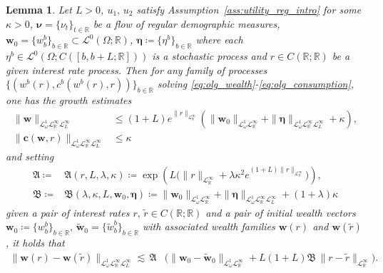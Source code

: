 \documentclass[10pt,a4paper]{amsart}
\theoremstyle{plain}
\newtheorem{lem}{Lemma}
\theoremstyle{plain}
\theoremstyle{definition}
\theoremstyle{remark}
\newcommand{\bc}{\mathbf{c}}
\newcommand{\bmeta}{\boldsymbol{\eta}}
\newcommand{\bnu}{\boldsymbol{\nu}}
\newcommand{\bw}{\mathbf{w}}
\newcommand{\mbR}{\mathbb{R}}
\newcommand{\mfA}{\mathfrak{A}}
\newcommand{\mfB}{\mathfrak{B}}
\newcommand{\msL}{\mathscr{L}}
\newcommand{\red}[1]{#1}
\begin{document}
\begin{lem}\label{lem:olg_growth_stable}
	 Let $L>0$, $u_1,\, u_2$ satisfy Assumption~\ref{ass:utility_reg_intro} for some $\kappa >0$, $\bnu = \{\nu_t\}_{t\in \mbR}$ be a flow of \emph{regular demographic measures}, $\bw_0  = \{w^b_b\}_{b\in \mbR}\subset\msL^0(\Omega;\mbR)$, $\bmeta \coloneqq \{\eta^b\}_{b\in \mbR}$ where each $\eta^b \in \msL^0(\Omega;C([b,b+L;\mbR]))$ is a stochastic process and $r \in C(\mbR;\mbR)$ be a given interest rate process. %
     Then for any family of processes $\{(w^b(r),c^b(w^b(r),r))\}_{b\in \mbR}$ solving  \eqref{eq:olg_wealth}-\eqref{eq:olg_consumption}, one has the growth estimates
	 \begin{align}
	 	 \|\bw\|_{\msL^1_\omega \msL^\infty_{\mbR} \msL^\infty_{L}} &\leq  (1+L)e^{\|r\|_{\msL^\infty_{\mbR}}} \left(\|\bw_0\|_{\msL^1_\omega \msL^\infty_\mbR } +    \|\bmeta\|_{ \msL^1_\omega \msL^\infty_{\mbR} \msL^\infty_{L}} + \kappa \right), \label{eq:olg_wealth_apriori_bound} \\
          \|\bc(\bw,r)\|_{\msL^1_\omega  \msL^\infty_{\mbR}\msL^\infty_{L}}  &\leq \kappa \label{eq:olg_consumption_bdd}
	 \end{align}
	 and setting 
	 \begin{align*}
	 	\mfA\coloneqq & \mfA(r,L,\lambda,\kappa) \coloneqq \exp\left(L\big(\|r\|_{\msL^\infty_\mbR} + \lambda \kappa^2 e^{(1+L)\|r\|_{\msL^\infty_{\mbR}} } \big)\right),\\
       \mfB\coloneqq &\mfB(\lambda,\kappa,L,\bw_0,\bmeta) \coloneqq  \|\bw_0\|_{\msL^1_\omega \msL^\infty_\mbR } +    \|\bmeta\|_{\msL^1_\omega \msL^\infty_{\mbR} \msL^\infty_{L}}+ (1+\lambda)\kappa 
	 \end{align*}
	 given a pair of interest rates $r,\,\tilde{r} \in C(\mbR;\mbR)$ and a pair of initial wealth vectors $\bw_0 \coloneqq \{w^b_b\}_{b\in \mbR},\, \tilde{\bw}_0 = \{\tilde{w}^b_b\}_{b\in \mbR}$ with associated wealth families $\bw(r)$ and $\bw(\tilde{r})$, it holds that
\begin{equation}\label{eq:olg_wealth_rate_stability}
	 \begin{aligned}
	 		\|\bw(r)-\bw(\tilde{r})\|_{\msL^1_\omega \msL^\infty_\mbR  \msL^\infty_L} \lesssim \,\mfA &\bigg( \|\bw_0-\tilde{\bw}_0\|_{\msL^1_\omega \msL^\infty_\mbR } + L (1+L)\mfB   \,\|r-\tilde{r}\|_{\msL^\infty_\mbR}\bigg).
	 	\end{aligned}

\end{equation}
\end{lem}
\end{document}
